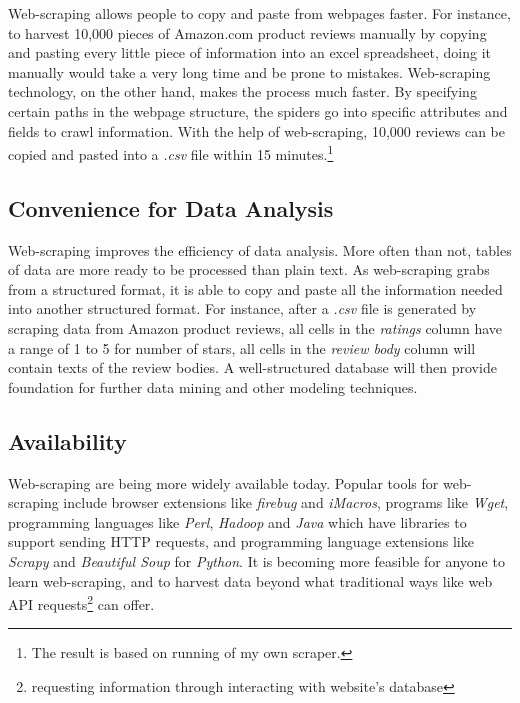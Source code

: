 \documentclass[12pt]{report}
\begin{document}
Web-scraping allows people to copy and paste from webpages faster. For instance, to harvest 10,000 pieces of Amazon.com product reviews manually by copying and pasting every little piece of information into an excel spreadsheet, doing it manually would take a very long time and be prone to mistakes. Web-scraping technology, on the other hand, makes the process much faster. By specifying certain paths in the webpage structure, the spiders go into specific attributes and fields to crawl information. With the help of web-scraping, 10,000 reviews can be copied and pasted into a \textit{.csv} file within 15 minutes.\footnote{The result is based on running of my own scraper.}



\subsection{Convenience for Data Analysis}

Web-scraping improves the efficiency of data analysis. More often than not, tables of data are more ready to be processed than plain text. As web-scraping grabs from a structured format, it is able to copy and paste all the information needed into another structured format. For instance, after a \textit{.csv} file is generated by scraping data from Amazon product reviews, all cells in the \textit{ratings} column have a range of 1 to 5 for number of stars, all cells in the \textit{review body} column will contain texts of the review bodies. A well-structured database will then provide foundation for further data mining and other modeling techniques.

\subsection{Availability}

Web-scraping are being more widely available today. Popular tools for web-scraping include browser extensions like \textit{firebug} and \textit{iMacros}, programs like \textit{Wget}, programming languages like \textit{Perl}, \textit{Hadoop} and \textit{Java} which have libraries to support sending HTTP requests, and programming language extensions like \textit{Scrapy} and \textit{Beautiful Soup} for \textit{Python}. It is becoming more feasible for anyone to learn web-scraping, and to harvest data beyond what traditional ways like web API requests\footnote{requesting information through interacting with website's database} can offer.
\end{document}
